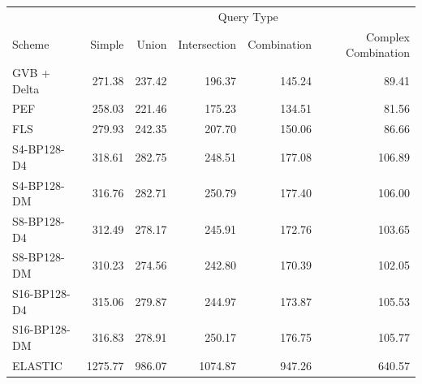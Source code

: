 \begin{tabular}{lrrrrr}
\toprule
 & \multicolumn{5}{c}{Query Type} \\
Scheme & Simple & Union & Intersection & Combination & Complex Combination \\
\midrule
GVB + Delta & 271.38 & 237.42 & 196.37 & 145.24 & 89.41 \\
PEF & 258.03 & 221.46 & 175.23 & 134.51 & 81.56 \\
FLS & 279.93 & 242.35 & 207.70 & 150.06 & 86.66 \\
S4-BP128-D4 & 318.61 & 282.75 & 248.51 & 177.08 & 106.89 \\
S4-BP128-DM & 316.76 & 282.71 & 250.79 & 177.40 & 106.00 \\
S8-BP128-D4 & 312.49 & 278.17 & 245.91 & 172.76 & 103.65 \\
S8-BP128-DM & 310.23 & 274.56 & 242.80 & 170.39 & 102.05 \\
S16-BP128-D4 & 315.06 & 279.87 & 244.97 & 173.87 & 105.53 \\
S16-BP128-DM & 316.83 & 278.91 & 250.17 & 176.75 & 105.77 \\
ELASTIC & 1275.77 & 986.07 & 1074.87 & 947.26 & 640.57 \\
\bottomrule
\end{tabular}
